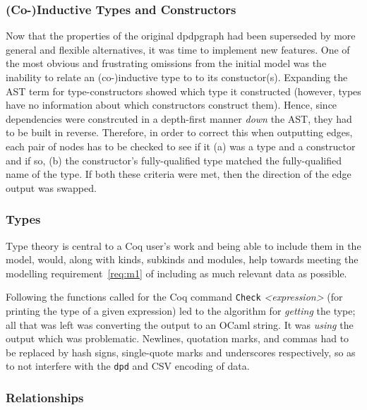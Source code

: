 \subsubsection{(Co-)Inductive Types and Constructors}

Now that the properties of the original dpdpgraph had been superseded by more
general and flexible alternatives, it was time to implement new features.  One
of the most obvious and frustrating omissions from the initial model was the
inability to relate an (co-)inductive type to to its constuctor(s). Expanding the
AST term for type-constructors showed which type it constructed (however, types
have no information about which constructors construct them). Hence, since
dependencies were constrcuted in a depth-first manner \emph{down} the AST, they
had to be built in reverse. Therefore, in order to correct this when outputting
edges, each pair of nodes has to be checked to see if it (a) was a type and a
constructor and if so, (b) the constructor's fully-qualified type matched the
fully-qualified name of the type. If both these criteria were met, then the
direction of the edge output was swapped.

\subsubsection{Types}

Type theory is central to a Coq user's work and being
able to include them in the model, would, along with kinds, subkinds and
modules, help towards meeting the modelling requirement~\ref{req:m1} of
including as much relevant data as possible. 

Following the functions called for the Coq command \texttt{Check}
\emph{<expression>} (for printing the type of a given expression) led to the
algorithm for \emph{getting} the type; all that was left was converting the
output to an OCaml string. It was \emph{using} the output which was problematic.
Newlines, quotation marks, and commas had to be replaced by hash signs,
single-quote marks and underscores respectively, so as to not interfere with the
\texttt{dpd} and CSV encoding of data.

\subsubsection{Relationships}

